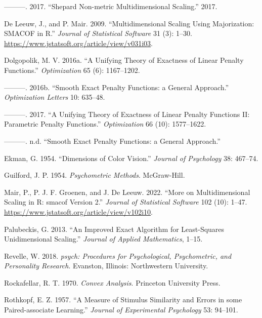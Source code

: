 \documentclass[
  12pt,
]{article}
\newlength{\cslhangindent}
\newenvironment{CSLReferences}[2] %
 {\begin{list}{}{%
  \setlength{\itemindent}{0pt}
  \setlength{\leftmargin}{0pt}
  \setlength{\parsep}{0pt}
  \ifodd #1
   \setlength{\leftmargin}{\cslhangindent}
   \setlength{\itemindent}{-1\cslhangindent}
  \fi
  \setlength{\itemsep}{#2\baselineskip}}}
 {\end{list}}
\begin{document}
\begin{CSLReferences}{1}{0}
---------. 2017. {``{Shepard Non-metric Multidimensional Scaling}.''}
2017.

De Leeuw, J., and P. Mair. 2009. {``{Multidimensional Scaling Using
Majorization: SMACOF in R}.''} \emph{Journal of Statistical Software} 31
(3): 1--30. \url{https://www.jstatsoft.org/article/view/v031i03}.

Dolgopolik, M. V. 2016a. {``{A Unifying Theory of Exactness of Linear
Penalty Functions}.''} \emph{Optimization} 65 (6): 1167--1202.

---------. 2016b. {``{Smooth Exact Penalty Functions: a General
Approach}.''} \emph{Optimization Letters} 10: 635--48.

---------. 2017. {``{A Unifying Theory of Exactness of Linear Penalty
Functions II: Parametric Penalty Functions}.''} \emph{Optimization} 66
(10): 1577--1622.

---------. n.d. {``{Smooth Exact Penalty Functions: a General
Approach}.''}

Ekman, G. 1954. {``{Dimensions of Color Vision}.''} \emph{Journal of
Psychology} 38: 467--74.

Guilford, J. P. 1954. \emph{Psychometric Methods}. McGraw-Hill.

Mair, P., P. J. F. Groenen, and J. De Leeuw. 2022. {``{More on
Multidimensional Scaling in R: smacof Version 2}.''} \emph{Journal of
Statistical Software} 102 (10): 1--47.
\url{https://www.jstatsoft.org/article/view/v102i10}.

Palubeckis, G. 2013. {``{An Improved Exact Algorithm for Least-Squares
Unidimensional Scaling}.''} \emph{Journal of Applied Mathematics},
1--15.

Revelle, W. 2018. \emph{{psych: Procedures for Psychological,
Psychometric, and Personality Research}}.{ Evanston, Illinois}:{
Northwestern University}.

Rockafellar, R. T. 1970. \emph{Convex Analysis}. Princeton University
Press.

Rothkopf, E. Z. 1957. {``{A Measure of Stimulus Similarity and Errors in
some Paired-associate Learning}.''} \emph{Journal of Experimental
Psychology} 53: 94--101.


\end{CSLReferences}
\end{document}
